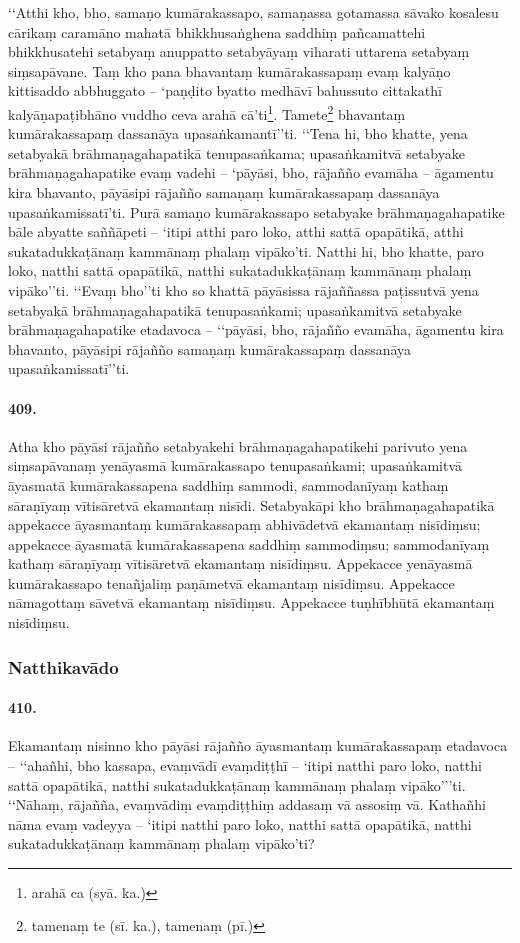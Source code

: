 ‘‘Atthi kho, bho, samaṇo kumārakassapo, samaṇassa gotamassa sāvako kosalesu cārikaṃ caramāno mahatā bhikkhusaṅghena saddhiṃ pañcamattehi bhikkhusatehi setabyaṃ anuppatto setabyāyaṃ viharati uttarena setabyaṃ siṃsapāvane. Taṃ kho pana bhavantaṃ kumārakassapaṃ evaṃ kalyāṇo kittisaddo abbhuggato – ‘paṇḍito byatto medhāvī bahussuto cittakathī kalyāṇapaṭibhāno vuddho ceva arahā cā’ti\footnote{arahā ca (syā. ka.)}. Tamete\footnote{tamenaṃ te (sī. ka.), tamenaṃ (pī.)} bhavantaṃ kumārakassapaṃ dassanāya upasaṅkamantī’’ti. ‘‘Tena hi, bho khatte, yena setabyakā brāhmaṇagahapatikā tenupasaṅkama; upasaṅkamitvā setabyake brāhmaṇagahapatike evaṃ vadehi – ‘pāyāsi, bho, rājañño evamāha – āgamentu kira bhavanto, pāyāsipi rājañño samaṇaṃ kumārakassapaṃ dassanāya upasaṅkamissatī’ti. Purā samaṇo kumārakassapo setabyake brāhmaṇagahapatike bāle abyatte saññāpeti – ‘itipi atthi paro loko, atthi sattā opapātikā, atthi sukatadukkaṭānaṃ kammānaṃ phalaṃ vipāko’ti. Natthi hi, bho khatte, paro loko, natthi sattā opapātikā, natthi sukatadukkaṭānaṃ kammānaṃ phalaṃ vipāko’’ti. ‘‘Evaṃ bho’’ti kho so khattā pāyāsissa rājaññassa paṭissutvā yena setabyakā brāhmaṇagahapatikā tenupasaṅkami; upasaṅkamitvā setabyake brāhmaṇagahapatike etadavoca – ‘‘pāyāsi, bho, rājañño evamāha, āgamentu kira bhavanto, pāyāsipi rājañño samaṇaṃ kumārakassapaṃ dassanāya upasaṅkamissatī’’ti.

\paragraph{409.} Atha kho pāyāsi rājañño setabyakehi brāhmaṇagahapatikehi parivuto yena siṃsapāvanaṃ yenāyasmā kumārakassapo tenupasaṅkami; upasaṅkamitvā āyasmatā kumārakassapena saddhiṃ sammodi, sammodanīyaṃ kathaṃ sāraṇīyaṃ vītisāretvā ekamantaṃ nisīdi. Setabyakāpi kho brāhmaṇagahapatikā appekacce āyasmantaṃ kumārakassapaṃ abhivādetvā ekamantaṃ nisīdiṃsu; appekacce āyasmatā kumārakassapena saddhiṃ sammodiṃsu; sammodanīyaṃ kathaṃ sāraṇīyaṃ vītisāretvā ekamantaṃ nisīdiṃsu. Appekacce yenāyasmā kumārakassapo tenañjaliṃ paṇāmetvā ekamantaṃ nisīdiṃsu. Appekacce nāmagottaṃ sāvetvā ekamantaṃ nisīdiṃsu. Appekacce tuṇhībhūtā ekamantaṃ nisīdiṃsu.

\subsubsection{Natthikavādo}

\paragraph{410.} Ekamantaṃ nisinno kho pāyāsi rājañño āyasmantaṃ kumārakassapaṃ etadavoca – ‘‘ahañhi, bho kassapa, evaṃvādī evaṃdiṭṭhī – ‘itipi natthi paro loko, natthi sattā opapātikā, natthi sukatadukkaṭānaṃ kammānaṃ phalaṃ vipāko’’’ti. ‘‘Nāhaṃ, rājañña, evaṃvādiṃ evaṃdiṭṭhiṃ addasaṃ vā assosiṃ vā. Kathañhi nāma evaṃ vadeyya – ‘itipi natthi paro loko, natthi sattā opapātikā, natthi sukatadukkaṭānaṃ kammānaṃ phalaṃ vipāko’ti?

